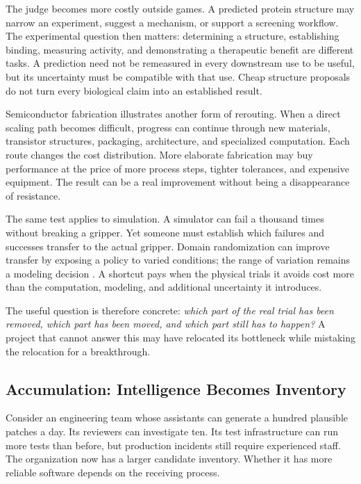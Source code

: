 \documentclass[11pt,openany]{book}
\begin{document}
The judge becomes more costly outside games. A predicted protein structure may narrow an experiment, suggest a mechanism, or support a screening workflow. The experimental question then matters: determining a structure, establishing binding, measuring activity, and demonstrating a therapeutic benefit are different tasks. A prediction need not be remeasured in every downstream use to be useful, but its uncertainty must be compatible with that use. Cheap structure proposals do not turn every biological claim into an established result.

Semiconductor fabrication illustrates another form of rerouting. When a direct scaling path becomes difficult, progress can continue through new materials, transistor structures, packaging, architecture, and specialized computation. Each route changes the cost distribution. More elaborate fabrication may buy performance at the price of more process steps, tighter tolerances, and expensive equipment. The result can be a real improvement without being a disappearance of resistance.

The same test applies to simulation. A simulator can fail a thousand times without breaking a gripper. Yet someone must establish which failures and successes transfer to the actual gripper. Domain randomization can improve transfer by exposing a policy to varied conditions; the range of variation remains a modeling decision \cite{tobin2017domain}. A shortcut pays when the physical trials it avoids cost more than the computation, modeling, and additional uncertainty it introduces.

The useful question is therefore concrete: \emph{which part of the real trial has been removed, which part has been moved, and which part still has to happen?} A project that cannot answer this may have relocated its bottleneck while mistaking the relocation for a breakthrough.

\subsection{Accumulation: Intelligence Becomes Inventory}

Consider an engineering team whose assistants can generate a hundred plausible patches a day. Its reviewers can investigate ten. Its test infrastructure can run more tests than before, but production incidents still require experienced staff. The organization now has a larger candidate inventory. Whether it has more reliable software depends on the receiving process.
\end{document}
